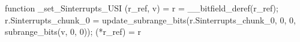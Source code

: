 function _set_Sinterrupts_USI (r_ref, v) = {
    r = __bitfield_deref(r_ref);
    r.Sinterrupts_chunk_0 = update_subrange_bits(r.Sinterrupts_chunk_0, 0, 0, subrange_bits(v, 0, 0));
    (*r_ref) = r
}
